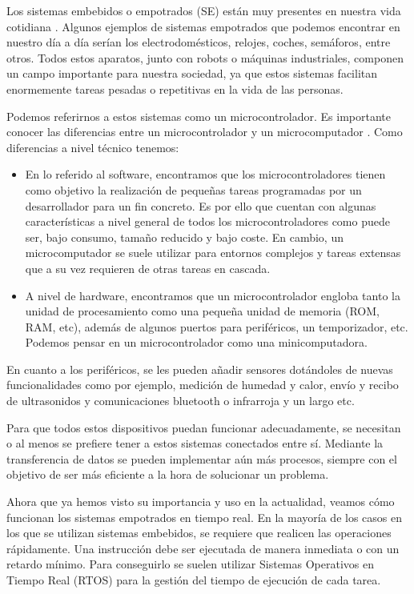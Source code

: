 
Los sistemas embebidos o empotrados (SE) están muy presentes en nuestra vida cotidiana \cite{UnicanSE}. Algunos ejemplos de sistemas empotrados que podemos encontrar en nuestro día a día serían los electrodomésticos, relojes, coches, semáforos, entre otros. Todos estos aparatos, junto con robots o máquinas industriales, componen un campo importante para nuestra sociedad, ya que estos sistemas facilitan enormemente tareas pesadas o repetitivas en la vida de las personas.

Podemos referirnos a estos sistemas como un microcontrolador. Es importante conocer las diferencias entre un microcontrolador y un microcomputador \cite{ALMCMP}. Como diferencias a nivel técnico tenemos:
 
\begin{itemize}
\item En lo referido al software, encontramos que los microcontroladores tienen como objetivo la realización de pequeñas tareas programadas por un desarrollador para un fin concreto. Es por ello que cuentan con algunas características a nivel general de todos los microcontroladores como puede ser, bajo consumo, tamaño reducido y bajo coste. En cambio, un microcomputador se suele utilizar para entornos complejos y tareas extensas que a su vez requieren de otras tareas en cascada.
\item A nivel de hardware, encontramos que un microcontrolador engloba tanto la unidad de procesamiento como una pequeña unidad de memoria (ROM, RAM, etc), además de algunos puertos para periféricos, un temporizador, etc. Podemos pensar en un microcontrolador como una minicomputadora.
\end{itemize}

En cuanto a los periféricos, se les pueden añadir sensores dotándoles de nuevas funcionalidades como por ejemplo, medición de humedad y calor, envío y recibo de ultrasonidos y comunicaciones bluetooth o infrarroja y un largo etc.  

Para que todos estos dispositivos puedan funcionar adecuadamente, se necesitan o al menos se prefiere tener a estos sistemas conectados entre sí. Mediante la transferencia de datos se pueden implementar aún más procesos, siempre con el objetivo de ser más eficiente a la hora de solucionar un problema.

Ahora que ya hemos visto su importancia y uso en la actualidad, veamos cómo funcionan los sistemas empotrados en tiempo real. En la mayoría de los casos en los que se utilizan sistemas embebidos, se requiere que realicen las operaciones rápidamente. Una instrucción debe ser ejecutada de manera inmediata o con un retardo mínimo. Para conseguirlo se suelen utilizar Sistemas Operativos en Tiempo Real (RTOS) para la gestión del tiempo de ejecución de cada tarea.


